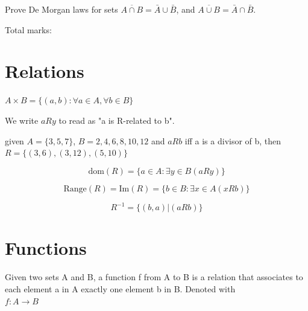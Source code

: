 \begin{example}
  Prove De Morgan laws for sets $\overline{A \cap B} = \bar{A} \cup \bar{B}$, and $\overline{A \cup B} = \bar{A} \cap \bar{B}$.
\end{example}






Total marks: 
\newpage



\section{Relations}

\begin{definition}
  $A \times B =  \{(a, b):  \forall a  \in  A, \forall b \in B\}$
\end{definition}

\begin{definition}
We write $a R y$ to read as "a  is R-related to b".
\end{definition}
\begin{example}
given $A = \{3, 5, 7\}$, $B = {2, 4, 6, 8, 10, 12}$ and $aRb$ iff a is a
divisor of b, then $R = \{(3, 6), (3, 12), (5, 10)\}$
\end{example}


\begin{definition}[Domain of $R$]
$$\text{dom}(R) = \{ a \in A : \exists y \in B (a R y) \}$$
\end{definition}

\begin{definition}
$$\text{Range}(R) = \text{Im}(R) = \{ b \in B : \exists x \in A (x R b) \}$$
\end{definition}

\begin{definition}[Inverse of $R$]
  $$R^{-1} = \{(b, a) | (a R b)\}$$
\end{definition}

\section{Functions}

\begin{definition}[Function $f: A \to B$]
Given two sets A and B, a function f from A to B is a relation
that associates to each element a in A exactly one element b in B.
Denoted with\\
$f : A \to B$

\end{definition}

